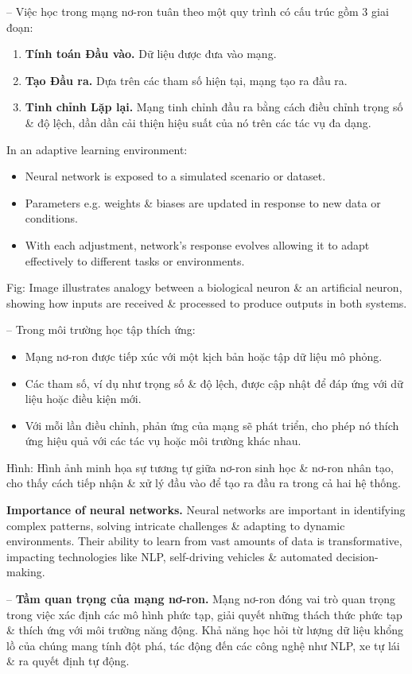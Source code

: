 \documentclass{article}
\begin{document}
-- Việc học trong mạng nơ-ron tuân theo một quy trình có cấu trúc gồm 3 giai đoạn:
\begin{enumerate}
    \item {\bf Tính toán Đầu vào.} Dữ liệu được đưa vào mạng.
    \item {\bf Tạo Đầu ra.} Dựa trên các tham số hiện tại, mạng tạo ra đầu ra.
    \item {\bf Tinh chỉnh Lặp lại.} Mạng tinh chỉnh đầu ra bằng cách điều chỉnh trọng số \& độ lệch, dần dần cải thiện hiệu suất của nó trên các tác vụ đa dạng.
\end{enumerate}
In an adaptive learning environment:
\begin{itemize}
    \item Neural network is exposed to a simulated scenario or dataset.
    \item Parameters e.g. weights \& biases are updated in response to new data or conditions.
    \item With each adjustment, network's response evolves allowing it to adapt effectively to different tasks or environments.
\end{itemize}
{\sf Fig: Image illustrates analogy between a biological neuron \& an artificial neuron, showing how inputs are received \& processed to produce outputs in both systems.}

-- Trong môi trường học tập thích ứng:
\begin{itemize}
    \item Mạng nơ-ron được tiếp xúc với một kịch bản hoặc tập dữ liệu mô phỏng.
    \item Các tham số, ví dụ như trọng số \& độ lệch, được cập nhật để đáp ứng với dữ liệu hoặc điều kiện mới.
    \item Với mỗi lần điều chỉnh, phản ứng của mạng sẽ phát triển, cho phép nó thích ứng hiệu quả với các tác vụ hoặc môi trường khác nhau.
\end{itemize}
{\sf Hình: Hình ảnh minh họa sự tương tự giữa nơ-ron sinh học \& nơ-ron nhân tạo, cho thấy cách tiếp nhận \& xử lý đầu vào để tạo ra đầu ra trong cả hai hệ thống.}

{\bf Importance of neural networks.} Neural networks are important in identifying complex patterns, solving intricate challenges \& adapting to dynamic environments. Their ability to learn from vast amounts of data is transformative, impacting technologies like NLP, self-driving vehicles \& automated decision-making.

-- {\bf Tầm quan trọng của mạng nơ-ron.} Mạng nơ-ron đóng vai trò quan trọng trong việc xác định các mô hình phức tạp, giải quyết những thách thức phức tạp \& thích ứng với môi trường năng động. Khả năng học hỏi từ lượng dữ liệu khổng lồ của chúng mang tính đột phá, tác động đến các công nghệ như NLP, xe tự lái \& ra quyết định tự động.
\end{document}

